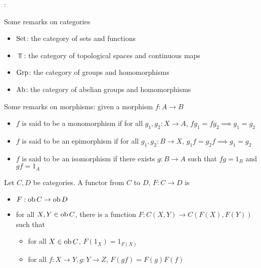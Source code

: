 \documentclass{report}
\begin{document}
\begin{remark}:

    Some remarks on categories
    \begin{itemize}
        \item $\operatorname{Set}$: the category of sets and functions
        \item $\Top$: the category of topological spaces and continuous maps
        \item $\operatorname{Grp}$: the category of groups and homomorphisms
        \item $\operatorname{Ab}$: the category of abelian groups and homomorphisms
    \end{itemize}

    Some remarks on morphisms: given a morphism $f: A \to B$
    \begin{itemize}
        \item $f$ is said to be a monomorphism if for all $g_1, g_2: X \to A$, $f g_1 = f g_2 \implies g_1 = g_2$
        \item $f$ is said to be an epimorphism if for all $g_1, g_2: B \to X$, $g_1 f = g_2 f \implies g_1 = g_2$
        \item $f$ is said to be an isomorphism if there exists $g: B \to A$ such that $fg = 1_B$ and $gf = 1_A$
    \end{itemize}
\end{remark}



\begin{definition}[functor]
    Let $C, D$ be categories. A functor from $C$ to $D$, $F: C \to D$ is
    \begin{itemize}
        \item $F: \operatorname{ob} C \to \operatorname{ob} D$
        \item for all $X, Y \in \operatorname{ob} C$, there is a function $F: C(X, Y) \to C(F(X), F(Y))$ such that
        \begin{itemize}
            \item for all $X \in \operatorname{ob} C$, $F(1_X) = 1_{F(X)}$
            \item for all $f: X \to Y, g: Y \to Z$, $F(gf) = F(g) F(f)$
            \begin{center}
            \end{center}
        \end{itemize}
    \end{itemize}
\end{definition}
\end{document}
